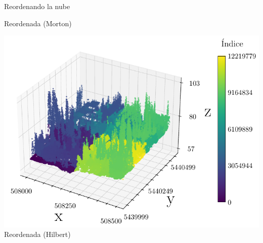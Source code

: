 \documentclass[aspectratio=169]{beamer}
\begin{document}
\begin{frame}{Reordenando la nube}
\begin{center}
\begin{minipage}{0.32\textwidth}
            \footnotesize Reordenada (Morton)
        \end{minipage}
        \hfill
        \begin{minipage}{0.32\textwidth}
            \centering
            \includegraphics[width=\linewidth]{img/plot_5080-54400_hilbert.pdf} \\
            \footnotesize Reordenada (Hilbert)
        \end{minipage}
    \end{center}
\end{frame}
\end{document}
